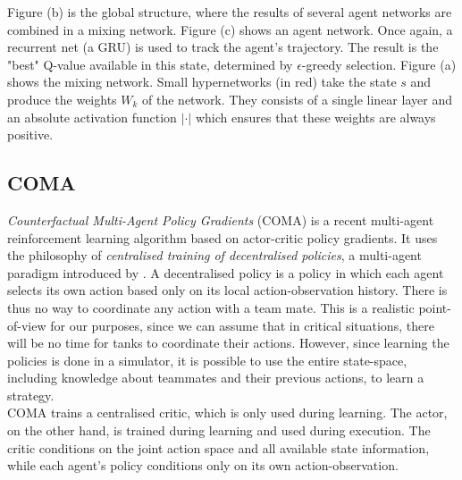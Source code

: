 Figure (b) is the global structure, where the results of several agent networks are combined in a mixing network. Figure (c) shows an agent network. Once again, a recurrent net (a GRU) is used to track the agent's trajectory. The result is the "best" Q-value available in this state, determined by $\epsilon$-greedy selection. Figure (a) shows the mixing network. Small hypernetworks (in red) take the state $s$ and produce the weights $W_k$ of the network. They consists of a single linear layer and an absolute activation function $|\cdot|$ which ensures that these weights are always positive.

\subsection{COMA}
\label{sec:intro_coma}
\emph{Counterfactual Multi-Agent Policy Gradients} (COMA) \cite{foerster2018counterfactual} is a recent multi-agent reinforcement learning algorithm based on actor-critic policy gradients. It uses the philosophy of \emph{centralised training of decentralised policies}, a multi-agent paradigm introduced by \cite{oliehoek2008optimal}. A decentralised policy is a policy in which each agent selects its own action based only on its local action-observation history. There is thus no way to coordinate any action with a team mate. This is a realistic point-of-view for our purposes, since we can assume that in critical situations, there will be no time for tanks to coordinate their actions. However, since learning the policies is done in a simulator, it is possible to use the entire state-space, including knowledge about teammates and their previous actions, to learn a strategy.\\

COMA trains a centralised critic, which is only used during learning. The actor, on the other hand, is trained during learning and used during execution. The critic conditions on the joint action space and all available state information, while each agent's policy conditions only on its own action-observation.\\

